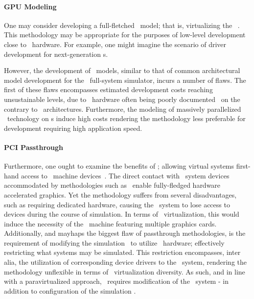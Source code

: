 \paragraph{GPU Modeling}
\label{par:backgroundandrelatedwork_graphicsvirtualization_gpumodeling}
One may consider developing a full-fletched \dvttermgpu\ model; that is, virtualizing the \dvttermgpu\ \dvttermisa .
This methodology may be appropriate for the purposes of low-level development close to \dvttermgpu\ hardware.
For example, one might imagine the scenario of driver development for next-generation \dvttermgpu s.

However, the development of \dvttermgpu\ models, similar to that of common architectural model development for the \dvttermsimics\ full-system simulator, incurs a number of flaws.
The first of these flaws encompasses estimated development costs reaching unsustainable levels, due to \dvttermgpu\ hardware often being poorly documented~ on the contrary to \dvttermcpu\ architectures.
Furthermore, the modeling of massively parallelized \dvttermgpu\ technology on \dvttermcpu s induce high costs rendering the methodology less preferable for development requiring high application speed.

\paragraph{PCI Passthrough}
\label{par:backgroundandrelatedwork_graphicsvirtualization_pcipassthrough}
Furthermore, one ought to examine the benefits of \dvttermpcipassthrough ; allowing virtual systems first-hand access to \dvttermhost\ machine devices~.
The direct contact with \dvttermhost\ system devices accommodated by methodologies such as \dvttermpcipassthrough\ enable fully-fledged hardware accelerated graphics.
Yet the methodology suffers from several disadvantages, such as requiring dedicated hardware, causing the \dvttermhost\ system to lose access to devices during the course of simulation.
In terms of \dvttermgpu\ virtualization, this would induce the necessity of the \dvttermhost\ machine featuring multiple graphics cards.
Additionally, and mayhaps the biggest flaw of passthrough methodologies, is the requirement of modifying the simulation \dvttermtarget\ to utilize \dvttermhost\ hardware; effectively restricting what systems may be simulated.
This restriction encompasses, inter alia, the utilization of corresponding device drivers to the \dvttermhost\ system, rendering the methodology unflexible in terms of \dvttermgpu\ virtualization diversity.
As such, and in line with a paravirtualized approach, \dvttermpcipassthrough\ requires modification of the \dvttermtarget\ system - in addition to configuration of the simulation \dvttermhost .

